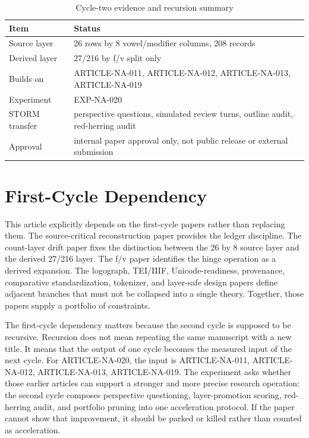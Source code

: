 \documentclass[sigconf,nonacm]{acmart}
\begin{document}
\begin{table}[t]
\caption{Cycle-two evidence and recursion summary}
\label{tab:cycle2}
\begin{tabular}{p{}p{}}
\toprule
Item & Status \\
\midrule
Source layer & 26 rows by 8 vowel/modifier columns, 208 records \\
Derived layer & 27/216 by f/v split only \\
Builds on & ARTICLE-NA-011, ARTICLE-NA-012, ARTICLE-NA-013, ARTICLE-NA-019 \\
Experiment & EXP-NA-020 \\
STORM transfer & perspective questions, simulated review turns, outline audit, red-herring audit \\
Approval & internal paper approval only, not public release or external submission \\
\bottomrule
\end{tabular}
\end{table}


\section{First-Cycle Dependency}
This article explicitly depends on the first-cycle papers rather than replacing
them. The source-critical reconstruction paper provides the ledger discipline.
The count-layer drift paper fixes the distinction between the 26 by 8 source
layer and the derived 27/216 layer. The f/v paper identifies the hinge operation
as a derived expansion. The logograph, TEI/IIIF, Unicode-readiness, provenance,
comparative standardization, tokenizer, and layer-safe design papers define
adjacent branches that must not be collapsed into a single theory. Together,
those papers supply a portfolio of constraints.

The first-cycle dependency matters because the second cycle is supposed to be
recursive. Recursion does not mean repeating the same manuscript with a new
title. It means that the output of one cycle becomes the measured input of the
next cycle. For ARTICLE-NA-020, the input is ARTICLE-NA-011, ARTICLE-NA-012, ARTICLE-NA-013, ARTICLE-NA-019. The experiment asks
whether those earlier articles can support a stronger and more precise research
operation: the second cycle composes perspective questioning, layer-promotion scoring, red-herring audit, and portfolio pruning into one acceleration protocol. If the paper cannot show that improvement, it should be
parked or killed rather than counted as acceleration.
\end{document}
